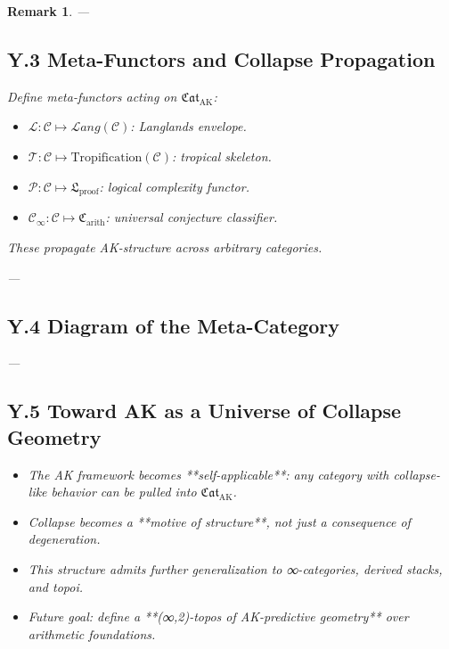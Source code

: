 \documentclass[11pt]{article}
\newtheorem{remark}[theorem]{Remark}
\begin{document}
\begin{remark}
---

\subsection*{Y.3 Meta-Functors and Collapse Propagation}

Define meta-functors acting on \( \mathfrak{Cat}_{\mathrm{AK}} \):

\begin{itemize}
  \item \( \mathscr{L} : \mathcal{C} \mapsto \mathcal{L}ang(\mathcal{C}) \): Langlands envelope.
  \item \( \mathscr{T} : \mathcal{C} \mapsto \mathrm{Tropification}(\mathcal{C}) \): tropical skeleton.
  \item \( \mathscr{P} : \mathcal{C} \mapsto \mathfrak{L}_{\mathrm{proof}} \): logical complexity functor.
  \item \( \mathscr{C}_\infty : \mathcal{C} \mapsto \mathfrak{C}_{\mathrm{arith}} \): universal conjecture classifier.
\end{itemize}

These propagate AK-structure across arbitrary categories.

---

\subsection*{Y.4 Diagram of the Meta-Category}

\vspace{1em}
\begin{center}
\end{center}
\vspace{1em}

---

\subsection*{Y.5 Toward AK as a Universe of Collapse Geometry}

\begin{itemize}
  \item The AK framework becomes **self-applicable**: any category with collapse-like behavior can be pulled into \( \mathfrak{Cat}_{\mathrm{AK}} \).
  \item Collapse becomes a **motive of structure**, not just a consequence of degeneration.
  \item This structure admits further generalization to ∞-categories, derived stacks, and topoi.
  \item Future goal: define a **(∞,2)-topos of AK-predictive geometry** over arithmetic foundations.
\end{itemize}



\end{remark}
\end{document}
